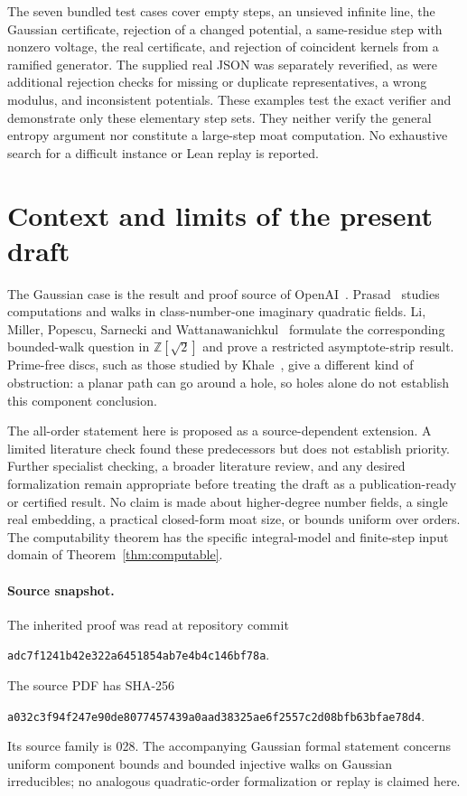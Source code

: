 \documentclass[11pt]{article}
\numberwithin{equation}{section}
\theoremstyle{definition}\newtheorem{definition}[theorem]{Definition}
\theoremstyle{remark}\newtheorem{remark}[theorem]{Remark}
\newcommand{\Z}{\mathbb Z}\newcommand{\Q}{\mathbb Q}\newcommand{\R}{\mathbb R}
\begin{document}
The seven bundled test cases cover empty steps, an unsieved infinite line, the Gaussian certificate, rejection of a changed potential, a same-residue step with nonzero voltage, the real certificate, and rejection of coincident kernels from a ramified generator. The supplied real JSON was separately reverified, as were additional rejection checks for missing or duplicate representatives, a wrong modulus, and inconsistent potentials. These examples test the exact verifier and demonstrate only these elementary step sets. They neither verify the general entropy argument nor constitute a large-step moat computation. No exhaustive search for a difficult instance or Lean replay is reported.

\section{Context and limits of the present draft}

The Gaussian case is the result and proof source of OpenAI~\cite{openai}. Prasad~\cite{prasad} studies computations and walks in class-number-one imaginary quadratic fields. Li, Miller, Popescu, Sarnecki and Wattanawanichkul~\cite{li} formulate the corresponding bounded-walk question in $\Z[\sqrt2]$ and prove a restricted asymptote-strip result. Prime-free discs, such as those studied by Khale~\cite{khale}, give a different kind of obstruction: a planar path can go around a hole, so holes alone do not establish this component conclusion.

The all-order statement here is proposed as a source-dependent extension. A limited literature check found these predecessors but does not establish priority. Further specialist checking, a broader literature review, and any desired formalization remain appropriate before treating the draft as a publication-ready or certified result. No claim is made about higher-degree number fields, a single real embedding, a practical closed-form moat size, or bounds uniform over orders. The computability theorem has the specific integral-model and finite-step input domain of Theorem~\ref{thm:computable}.

\paragraph{Source snapshot.}
The inherited proof was read at repository commit
\begin{center}\small\texttt{adc7f1241b42e322a6451854ab7e4b4c146bf78a}.\end{center}
The source PDF has SHA-256
\begin{center}\small\texttt{a032c3f94f247e90de8077457439a0aad38325ae6f2557c2d08bfb63bfae78d4}.\end{center}
Its source family is 028. The accompanying Gaussian formal statement concerns uniform component bounds and bounded injective walks on Gaussian irreducibles; no analogous quadratic-order formalization or replay is claimed here.
\end{document}

